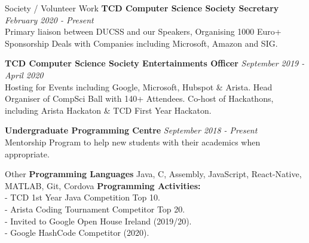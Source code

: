 \documentclass{resume} %
\begin{document}
\begin{rSection}{Society / Volunteer Work}
{\bf TCD Computer Science Society Secretary} \hfill {\em February 2020 - Present}
\\Primary liaison between DUCSS and our Speakers, Organising 1000 Euro+ Sponsorship Deals with Companies including Microsoft, Amazon and SIG. 

{\bf TCD Computer Science Society Entertainments Officer} \hfill {\em September 2019 - April 2020}
\\ Hosting for Events including Google, Microsoft, Hubspot \& Arista. Head Organiser of CompSci Ball with 140+ Attendees. Co-host of Hackathons, including Arista Hackaton \& TCD First Year Hackaton.

{\bf Undergraduate Programming Centre} \hfill {\em September 2018 - Present}
\\ Mentorship Program to help new students with their academics when appropriate.

\end{rSection}









\begin{rSection}{Other} 
{\bf Programming Languages} \hfill
 Java, C, Assembly, JavaScript, React-Native, MATLAB, Git, Cordova
 {\bf Programming Activities:}\\
- TCD 1st Year Java Competition Top 10.\\
- Arista Coding Tournament Competitor Top 20.\\
- Invited to Google Open House Ireland (2019/20).\\
- Google HashCode Competitor (2020).\\




\end{rSection}
\end{document}
